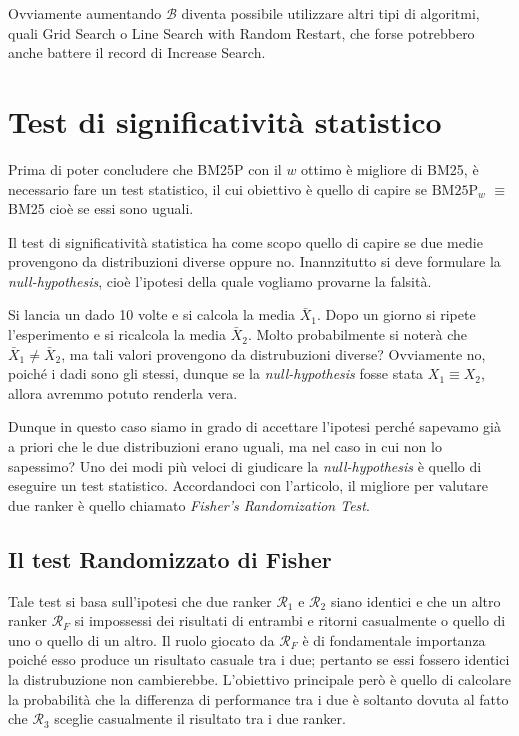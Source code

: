 Ovviamente aumentando $\mathcal{B}$ diventa possibile utilizzare altri
tipi di algoritmi, quali Grid Search o Line Search with Random Restart, che
forse potrebbero anche battere il record di Increase Search.

\section{Test di significatività statistico}

Prima di poter concludere che BM25P con il $w$ ottimo è migliore di BM25, è necessario
fare un test statistico, il cui obiettivo è quello di capire se $\text{BM25P}_w$ $\equiv$ BM25
cioè se essi sono uguali.

Il test di significatività statistica ha come scopo
quello di capire se due medie provengono da distribuzioni diverse oppure no.
Inannzitutto si deve formulare la \textit{null-hypothesis}, cioè l'ipotesi
della quale vogliamo provarne la falsità.

\begin{esempio}
	Si lancia un dado 10 volte e si calcola la media $\bar{X}_1$. Dopo un giorno si ripete l'esperimento
	e si ricalcola la media $\bar{X}_2$. Molto probabilmente si noterà che $\bar{X}_1 \neq \bar{X}_2$,
	ma tali valori provengono da distrubuzioni diverse?
	Ovviamente no, poiché i dadi sono gli stessi, dunque se la \textit{null-hypothesis} fosse
	stata $X_1 \equiv X_2$, allora avremmo potuto renderla vera.
\end{esempio}

Dunque in questo caso siamo in grado di accettare l'ipotesi perché
sapevamo già a priori che le due distribuzioni erano uguali, ma nel caso
in cui non lo sapessimo?
Uno dei modi più veloci di giudicare la \textit{null-hypothesis} è quello di eseguire un test statistico.
Accordandoci con l'articolo\cite{10.1145/1321440.1321528}, il migliore per valutare
due ranker è quello chiamato \textit{Fisher's Randomization Test}.

\subsection{Il test Randomizzato di Fisher}
Tale test si basa sull'ipotesi che due ranker $\mathcal{R}_1 $ e $\mathcal{R}_2$ siano identici
e che un altro ranker $\mathcal{R}_F$ si impossessi dei risultati di entrambi e
ritorni casualmente o quello di uno o quello di un altro.
Il ruolo giocato da $\mathcal{R}_F$ è di fondamentale importanza poiché esso produce un risultato
casuale tra i due; pertanto se essi fossero identici la distrubuzione non cambierebbe.
L'obiettivo principale però è quello di calcolare la probabilità che la differenza
di performance tra i due è soltanto dovuta al fatto che $\mathcal{R}_3$ sceglie casualmente
il risultato tra i due ranker.

